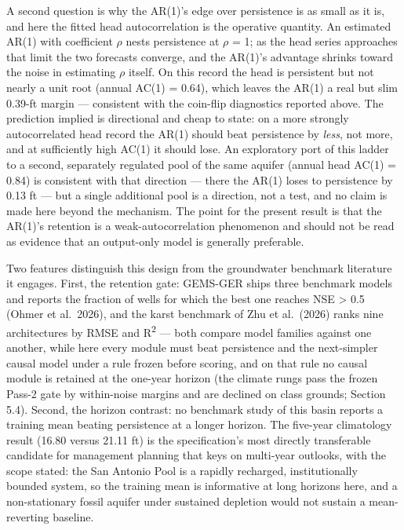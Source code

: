 \documentclass[11pt]{article}
\begin{document}
A second question is why the AR(1)'s edge over persistence is as small
as it is, and here the fitted head autocorrelation is the operative
quantity. An estimated AR(1) with coefficient \ensuremath{\rho} nests persistence at
\ensuremath{\rho} = 1; as the head series approaches that limit the two forecasts
converge, and the AR(1)'s advantage shrinks toward the noise in
estimating \ensuremath{\rho} itself. On this record the head is persistent but not
nearly a unit root (annual AC(1) = 0.64), which leaves the AR(1) a real
but slim 0.39-ft margin --- consistent with the coin-flip diagnostics
reported above. The prediction implied is directional and cheap to
state: on a more strongly autocorrelated head record the AR(1) should
beat persistence by \emph{less}, not more, and at sufficiently high
AC(1) it should lose. An exploratory port of this ladder to a second,
separately regulated pool of the same aquifer (annual head AC(1) = 0.84)
is consistent with that direction --- there the AR(1) loses to
persistence by 0.13 ft --- but a single additional pool is a direction,
not a test, and no claim is made here beyond the mechanism. The point
for the present result is that the AR(1)'s retention is a
weak-autocorrelation phenomenon and should not be read as evidence that
an output-only model is generally preferable.

Two features distinguish this design from the groundwater benchmark
literature it engages. First, the retention gate: GEMS-GER ships three
benchmark models and reports the fraction of wells for which the best
one reaches NSE \textgreater{} 0.5 (Ohmer et al.~2026), and the karst
benchmark of Zhu et al.~(2026) ranks nine architectures by RMSE and R\textsuperscript{2}
--- both compare model families against one another, while here every
module must beat persistence and the next-simpler causal model under a
rule frozen before scoring, and on that rule no causal module is
retained at the one-year horizon (the climate rungs pass the frozen
Pass-2 gate by within-noise margins and are declined on class grounds;
Section 5.4). Second, the horizon contrast: no benchmark study of this
basin reports a training mean beating persistence at a longer horizon.
The five-year climatology result (16.80 versus 21.11 ft) is the
specification's most directly transferable candidate for management
planning that keys on multi-year outlooks, with the scope stated: the
San Antonio Pool is a rapidly recharged, institutionally bounded system,
so the training mean is informative at long horizons here, and a
non-stationary fossil aquifer under sustained depletion would not
sustain a mean-reverting baseline.
\end{document}
